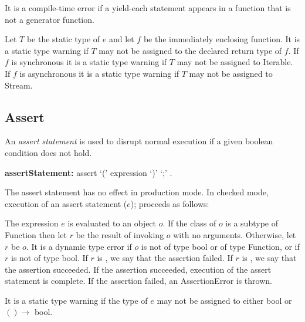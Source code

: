 \documentclass{article}
\newcommand{\code}[1]{{\sf #1}}
\begin{document}
\begin{itemize}
\LMHash{}
It is a compile-time error if a yield-each statement appears in a function that is not a generator function.

\LMHash{}
Let $T$ be the static type of $e$ and let $f$ be the immediately enclosing function.  It is a static type warning if $T$ may not be assigned to the declared return type of $f$.  If $f$ is synchronous it is a static  type warning if $T$ may not be assigned to \code{Iterable}.  If $f$ is asynchronous it is a static  type warning if $T$ may not be assigned to \code{Stream}.


\subsection{ Assert}

\LMHash{}
An {\em assert statement} is used to disrupt normal execution if a given boolean condition does not hold.

\begin{grammar}
{\bf assertStatement:}
   assert `(' expression `)' `{\escapegrammar ;}'
      .
\end{grammar}

\LMHash{}
The assert statement has no effect in production mode. In checked mode, execution of an assert statement \code{\ASSERT{}($e$);} proceeds as follows:

\LMHash{}
The expression $e$ is evaluated to an object $o$. If the class of $o$ is a subtype of \code{Function} then let $r$ be the result of invoking $o$ with no arguments. Otherwise, let $r$ be $o$.
It is a dynamic type error if $o$ is not of type \code{bool} or of type \code{Function}, or if $r$ is not of type \code{bool}.  If $r$ is \FALSE{}, we say that the assertion failed. If $r$ is \TRUE{}, we say that the assertion succeeded. If the assertion succeeded, execution of the assert statement is complete. If the assertion failed, an \code{AssertionError} is thrown.


\LMHash{}
 It is a static type warning if the type of $e$ may not be assigned to either  \code{bool} or $() \rightarrow$ \code{bool}.



\end{itemize}
\end{document}
